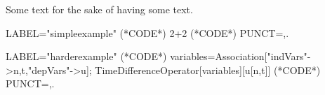 \documentclass{article}
\begin{document}
Some text for the sake of having some text.

\begin{EXE}
		LABEL="simpleexample"
		(*CODE*)
		2+2
		(*CODE*)
		PUNCT={,.}
\end{EXE}

\begin{EXE}
	LABEL="harderexample"
	(*CODE*)
	variables=Association["indVars"->{n,t},"depVars"->{u}];
	TimeDifferenceOperator[variables][u[n,t]]
	(*CODE*)
	PUNCT={,.}
\end{EXE}

\begin{small}
	
	
\end{small}

\begin{small}
	
	
\end{small}
\end{document}
